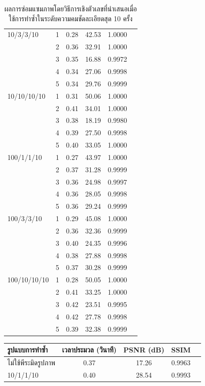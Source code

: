 \documentclass[hidelinks, a4paper,12pt]{article}
\numberwithin{equation}{section}							%
\numberwithin{equation}{section}
\begin{document}
{\begin{table}[H]
\begin{tabular}[ht]{|l|c|c|c|c|c|}
			\hline
			10/3/3/10  & 1 & 0.28 & 42.53 & 1.0000\\
			& 2 & 0.36 & 32.91 & 1.0000 \\
			& 3 & 0.35 & 16.88 & 0.9972 \\
			& 4 & 0.34 & 27.06 &  0.9998 \\
			& 5 & 0.34 & 29.76 & 0.9999 \\
			\hline
			10/10/10/10  & 1 & 0.31 & 50.06 & 1.0000 \\
			& 2 & 0.41 & 34.01 & 1.0000\\
			& 3 & 0.38 & 18.19 & 0.9980\\
			& 4 & 0.39 & 27.50 & 0.9998\\
			& 5 & 0.40 & 33.05 &  1.0000\\
			\hline
			100/1/1/10  & 1 & 0.27 & 43.97 & 1.0000 \\
			& 2 & 0.37  & 31.28 & 0.9999\\
			& 3 & 0.36 & 24.98 & 0.9997\\
			& 4 & 0.36  &28.05 & 0.9998\\
			& 5 & 0.36 & 29.24 & 0.9999 \\
			\hline
			100/3/3/10  & 1 & 0.29 & 45.08& 1.0000 \\
			& 2 & 0.36 & 32.36 & 0.9999\\
			& 3 & 0.40 & 24.35 & 0.9996\\
			& 4 & 0.38 & 27.88 & 0.9998\\
			& 5 & 0.37 & 30.28 & 0.9999 \\
			\hline
			100/10/10/10  & 1 & 0.28 & 50.05 &  1.0000\\
			& 2 & 0.41 & 33.25 &  1.0000\\
			& 3 & 0.42 & 23.51 & 0.9995 \\
			& 4 & 0.42 & 27.78 & 0.9998 \\
			& 5 & 0.39 & 32.38 & 0.9999 \\
			\hline
		\end{tabular}
		\caption{ผลการซ่อมแซมภาพโดยวิธีการเชิงตัวเลขที่นำเสนอเมื่อใช้การทำซ้ำในระดับความคมชัดละเอียดสุด 10 ครั้ง}
		\label{result:table-multiresolution2}
	\end{table}	
	\begin{table}[H]
		\centering
		\begin{tabular}[ht]{|l|c|c|c|c|}
			\hline
			รูปแบบการทำซ้ำ  & เวลาประมวล  (วินาที) & PSNR (dB) & SSIM \\
			\hline
			ไม่ใช้พีระมิดรูปภาพ & 0.37 & 17.26 & 0.9963  \\
			10/1/1/10 & 0.40 & 28.54 & 0.9993 \\

\end{tabular}
\end{table}}
\end{document}
